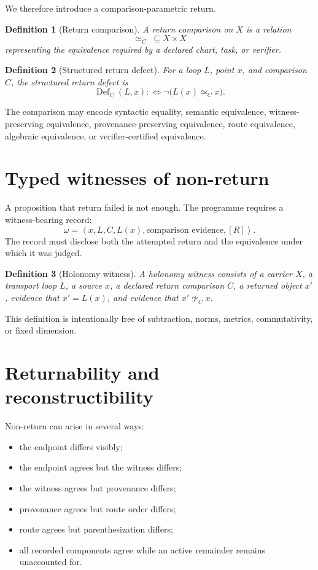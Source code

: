 \documentclass[12pt,openany]{book}
\newtheorem{definition}{Definition}[chapter]
\theoremstyle{remark}
\newcommand{\Remainder}{[R]}
\newcommand{\typedtuple}[1]{\left\langle #1 \right\rangle}
\begin{document}
We therefore introduce a comparison-parametric return.

\begin{definition}[Return comparison]
A return comparison on $X$ is a relation
\[
\simeq_C\;\subseteq X\times X
\]
representing the equivalence required by a declared chart, task, or verifier.
\end{definition}

\begin{definition}[Structured return defect]
For a loop $L$, point $x$, and comparison $C$, the structured return defect is
\[
\operatorname{Def}_C(L,x)
:\Longleftrightarrow
\neg\bigl(L(x)\simeq_C x\bigr).
\]
\end{definition}

The comparison may encode syntactic equality, semantic equivalence, witness-preserving equivalence, provenance-preserving equivalence, route equivalence, algebraic equivalence, or verifier-certified equivalence.

\section{Typed witnesses of non-return}
A proposition that return failed is not enough. The programme requires a witness-bearing record:
\[
\omega=\typedtuple{x,L,C,L(x),\text{comparison evidence},\Remainder}.
\]
The record must disclose both the attempted return and the equivalence under which it was judged.

\begin{definition}[Holonomy witness]
A holonomy witness consists of a carrier $X$, a transport loop $L$, a source $x$, a declared return comparison $C$, a returned object $x'$, evidence that $x'=L(x)$, and evidence that $x'\not\simeq_C x$.
\end{definition}

This definition is intentionally free of subtraction, norms, metrics, commutativity, or fixed dimension.

\section{Returnability and reconstructibility}
Non-return can arise in several ways:
\begin{itemize}
\item the endpoint differs visibly;
\item the endpoint agrees but the witness differs;
\item the witness agrees but provenance differs;
\item provenance agrees but route order differs;
\item route agrees but parenthesization differs;
\item all recorded components agree while an active remainder remains unaccounted for.
\end{itemize}
\end{document}
